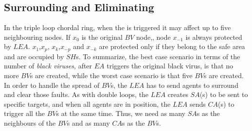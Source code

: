 \subsection{Surrounding and Eliminating}

 

In the triple loop chordal ring, when the \bv is triggered it may affect up to five  neighbouring nodes.
If $x_0$ is the original $BV$ node,, node $x_{-1}$ is always protected by $LEA$. $x_{1} $,$x_{p} $, $x_{k}$,$x_{-p} $ and $x_{-k}$ are  protected only if they belong to the safe area and are occupied by $SH$s.
To summarize, the best case scenario in terms of the number of  {\it black viruses}, after $EA$ triggers the original black virus, is that no more $BV$s are created, while the worst case scenario is that five $BV$s are created.  \\In order to handle the spread of $BV$s, the $LEA$ has to send agents to surround and clear those faults. 
As with double loops, the $LEA$ creates $SA$(s) to be sent to specific targets, and when all agents are in position, the $LEA$ sends $CA$(s) to trigger all the $BV$s at the same time. Thus, we need as many $SA$s as the neighbours of the $BV$s and as many $CA$s as the $BV$s. 



